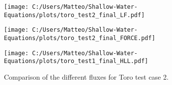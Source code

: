 \begin{figure}[H]
    \centering
    \begin{minipage}{0.45\textwidth}
        \centering
        \texttt{[image: C:/Users/Matteo/Shallow-Water-Equations/plots/toro\_test2\_final\_LF.pdf]}
    \end{minipage}%
    \hfill
    \begin{minipage}{0.45\textwidth}
        \centering
        \texttt{[image: C:/Users/Matteo/Shallow-Water-Equations/plots/toro\_test2\_final\_FORCE.pdf]}
    \end{minipage}
    
    \vspace{0.5cm} %
    \begin{minipage}{0.45\textwidth}
        \centering
        \texttt{[image: C:/Users/Matteo/Shallow-Water-Equations/plots/toro\_test1\_final\_HLL.pdf]}
    \end{minipage}
    \caption{Comparison of the different fluxes for Toro test case 2.}\label{fig:toro_test2_fluxes}
\end{figure}



